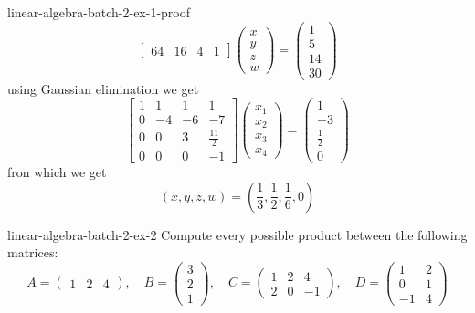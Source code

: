 \documentclass[preview]{standalone}
\begin{document}
\begin{snippetsolution}{linear-algebra-batch-2-ex-1-proof}{}
\[\begin{bmatrix}
            64 & 16 & 4 & 1
        \end{bmatrix}
        \begin{pmatrix}
            x \\
            y \\
            z \\
            w
        \end{pmatrix}
        = \begin{pmatrix}
            1 \\
            5 \\
            14 \\
            30
        \end{pmatrix}
    \]
    using Gaussian elimination we get
    \[
        \begin{bmatrix}
            1 & 1 & 1 & 1 \\
            0 & -4 & -6 & -7 \\
            0 & 0 & 3 & \frac{11}{2} \\
            0 & 0 & 0 & -1
        \end{bmatrix}
        \begin{pmatrix}
            x_1 \\
            x_2 \\
            x_3 \\
            x_4
        \end{pmatrix}
        = \begin{pmatrix}
            1 \\
            -3 \\
            \frac{1}{2} \\
            0
        \end{pmatrix}
    \]
    fron which we get
    \[
        (x,y,z,w) = \left(
            \frac{1}{3}, \frac{1}{2}, \frac{1}{6}, 0
        \right)
    \]
\end{snippetsolution}

\begin{snippetexercise}{linear-algebra-batch-2-ex-2}{}
    Compute every possible product between the following matrices:
    \[
        A = \begin{pmatrix}
            1 & 2 & 4
        \end{pmatrix},
        \quad
        B = \begin{pmatrix}
            3 \\ 2 \\ 1
        \end{pmatrix},
        \quad
        C = \begin{pmatrix}
            1 & 2 & 4 \\
            2 & 0 & -1
        \end{pmatrix},
        \quad
        D = \begin{pmatrix}
            1 & 2 \\
            0 & 1 \\
            -1 & 4
        \end{pmatrix}
    \]
\end{snippetexercise}
\end{document}
